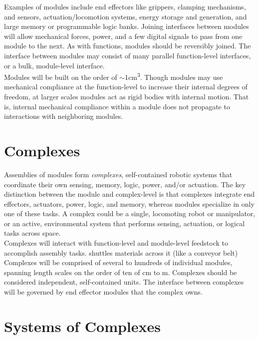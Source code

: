 {Examples of modules include end effectors like grippers, clamping mechanisms, and sensors, actuation/locomotion systems, energy storage and generation, and large memory or programmable logic banks.  Joining interfaces between modules will allow mechanical forces, power, and a few digital signals to pass from one module to the next.  As with functions, modules should be reversibly joined.  The interface between modules may consist of many parallel function-level interfaces, or a bulk, module-level interface.\\

Modules will be built on the order of $\sim$1cm\textsuperscript{3}.  Though modules may use mechanical compliance at the function-level to increase their internal degrees of freedom, at larger scales modules act as rigid bodies with internal motion.  That is, internal mechanical compliance within a module does not propagate to interactions with neighboring modules.%

\section{Complexes}

Assemblies of modules form \textit{complexes}, self-contained robotic systems that coordinate their own sensing, memory, logic, power, and/or actuation.  The key distinction between the module and complex-level is that complexes integrate end effectors, actuators, power, logic, and memory, whereas modules specialize in only one of these tasks.  A complex could be a single, locomoting robot or manipulator, or an active, environmental system that performs sensing, actuation, or logical tasks across space.\\

Complexes will interact with function-level and module-level feedstock to accomplish assembly tasks.  shuttles materials across it (like a conveyor belt)\\

Complexes will be comprised of several to hundreds of individual modules, spanning length scales on the order of ten of cm to m.  Complexes should be considered independent, self-contained units.  The interface between complexes will be governed by end effector modules that the complex owns.

\section{Systems of Complexes}

}
